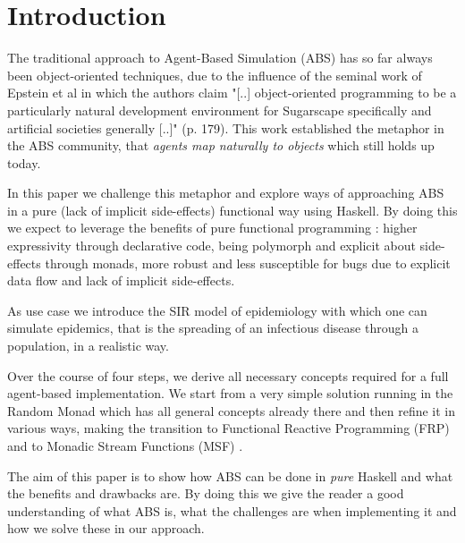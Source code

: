 \section{Introduction}
The traditional approach to Agent-Based Simulation (ABS) has so far always been object-oriented techniques, due to the influence of the seminal work of Epstein et al \cite{epstein_growing_1996} in which the authors claim "[..] object-oriented programming to be a particularly natural development environment for Sugarscape specifically and artificial societies generally [..]" (p. 179). This work established the metaphor in the ABS community, that \textit{agents map naturally to objects} \cite{north_managing_2007} which still holds up today.

In this paper we challenge this metaphor and explore ways of approaching ABS in a pure (lack of implicit side-effects) functional way using Haskell. By doing this we expect to leverage the benefits of pure functional programming \cite{hudak_history_2007}: higher expressivity through declarative code, being polymorph and explicit about side-effects through monads, more robust and less susceptible for bugs due to explicit data flow and lack of implicit side-effects.

As use case we introduce the SIR model of epidemiology with which one can simulate epidemics, that is the spreading of an infectious disease through a population, in a realistic way.

Over the course of four steps, we derive all necessary concepts required for a full agent-based implementation. We start from a very simple solution running in the Random Monad which has all general concepts already there and then refine it in various ways, making the transition to Functional Reactive Programming (FRP) \cite{wan_functional_2000} and to Monadic Stream Functions (MSF) \cite{perez_functional_2016}.

The aim of this paper is to show how ABS can be done in \textit{pure} Haskell and what the benefits and drawbacks are. By doing this we give the reader a good understanding of what ABS is, what the challenges are when implementing it and how we solve these in our approach.

